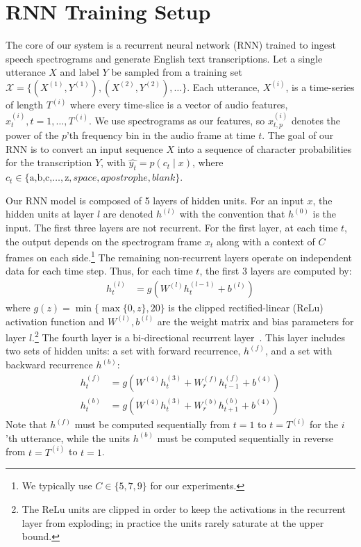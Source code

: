 \section{RNN Training Setup}
\label{sec:deepspeech:model}

The core of our system is a recurrent neural network (RNN) trained to ingest
speech spectrograms and generate English text transcriptions. Let a single
utterance $X$ and label $Y$ be sampled from a training set $\mathcal{X} =
\{(X^{(1)},Y^{(1)}),(X^{(2)},Y^{(2)}),\ldots\}$. Each utterance, $X^{(i)}$, is
a time-series of length $T^{(i)}$ where every time-slice is a vector of audio
features, $x_t^{(i)}, t=1,\ldots,T^{(i)}$. We use spectrograms as our features,
so $x^{(i)}_{t,p}$ denotes the power of the $p$'th frequency bin in the audio
frame at time $t$. The goal of our RNN is to convert an input sequence $X$ into
a sequence of character probabilities for the transcription $Y$, with
$\hat{y_t} = p(c_t \mid x)$, where $c_t \in \{\textrm{a,b,c,}\ldots,\textrm{z},
\textit{space},\textit{apostrophe},\textit{blank}\}$.

Our RNN model is composed of 5 layers of hidden units.  For an input $x$, the
hidden units at layer $l$ are denoted $h^{(l)}$ with the convention that
$h^{(0)}$ is the input. The first three layers are not recurrent. For the first
layer, at each time $t$, the output depends on the spectrogram frame $x_t$
along with a context of $C$ frames on each side.\footnote{We typically use
$C\in \{5, 7, 9\}$ for our experiments.} The remaining non-recurrent layers
operate on independent data for each time step. Thus, for each time $t$, the
first 3 layers are computed by:
\begin{align*}
    h^{(l)}_t &= g(W^{(l)} h^{(l-1)}_t + b^{(l)})
\end{align*}
where $g(z) = \min\{\max\{0,z\}, 20\}$ is the clipped rectified-linear (ReLu)
activation function and $W^{(l)}, b^{(l)}$ are the weight matrix and bias
parameters for layer $l$.\footnote{The ReLu units are clipped in order to keep
the activations in the recurrent layer from exploding; in practice the units
rarely saturate at the upper bound.} The fourth layer is a bi-directional
recurrent layer~\cite{schuster1997bidirectional}. This layer includes two sets
of hidden units: a set with forward recurrence, $h^{(f)}$, and a set with
backward recurrence $h^{(b)}$:
\begin{align*}
    h^{(f)}_t &= g(W^{(4)} h^{(3)}_t + W_r^{(f)} h^{(f)}_{t-1} + b^{(4)}) \\
    h^{(b)}_t &= g(W^{(4)} h^{(3)}_t + W_r^{(b)} h^{(b)}_{t+1} + b^{(4)})
\end{align*}
Note that $h^{(f)}$ must be computed sequentially from $t=1$ to $t=T^{(i)}$ for
the $i$'th utterance, while the units $h^{(b)}$ must be computed sequentially
in reverse from $t=T^{(i)}$ to $t=1$.

